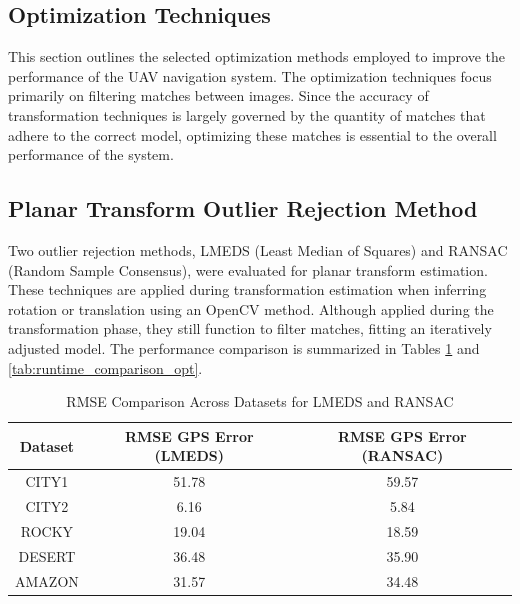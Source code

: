 \begin{itemize}
\section{Optimization Techniques}

This section outlines the selected optimization methods employed to improve the performance of the UAV navigation system. The optimization techniques focus primarily on filtering matches between images. Since the accuracy of transformation techniques is largely governed by the quantity of matches that adhere to the correct model, optimizing these matches is essential to the overall performance of the system.


\subsection{Planar Transform Outlier Rejection Method}

Two outlier rejection methods, LMEDS (Least Median of Squares) and RANSAC (Random Sample Consensus), were evaluated for planar transform estimation. These techniques are applied during transformation estimation when inferring rotation or translation using an OpenCV method. Although applied during the transformation phase, they still function to filter matches, fitting an iteratively adjusted model. The performance comparison is summarized in Tables \ref{tab:rmse_comparison_opt} and \ref{tab:runtime_comparison_opt}.


\begin{table}[H]
    \centering
    \caption{RMSE Comparison Across Datasets for LMEDS and RANSAC}
    \label{tab:rmse_comparison_opt}
    \begin{tabular}{|c|c|c|}
    \hline
    \textbf{Dataset} & \textbf{RMSE GPS Error (LMEDS)} & \textbf{RMSE GPS Error (RANSAC)} \\ \hline
    CITY1   & 51.78 & 59.57 \\ \hline
    CITY2   & 6.16  & 5.84  \\ \hline
    ROCKY   & 19.04 & 18.59 \\ \hline
    DESERT  & 36.48 & 35.90 \\ \hline
    AMAZON  & 31.57 & 34.48 \\ \hline
    \end{tabular}
\end{table}


\end{itemize}
